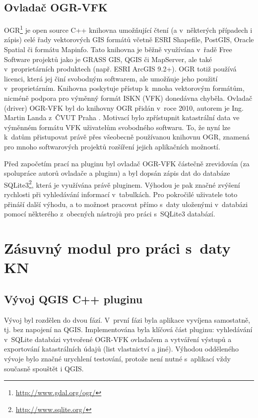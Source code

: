 \documentclass[a4paper,12pt]{article}
\begin{document}
\subsection{Ovladač OGR-VFK}
OGR\footnote{\url{http://www.gdal.org/ogr/}} je open source C++ knihovna umožňující čtení (a v~některých případech i zápis)
celé řady vektorových GIS formátů včetně ESRI Shapefile, PostGIS, Oracle Spatial či formátu \mbox{Mapinfo}.
Tato knihovna je běžně využívána v~řadě Free Software projektů jako je GRASS GIS, QGIS či \mbox{MapServer}, ale také v~proprietárních produktech (např. ESRI ArcGIS 9.2+).
OGR totiž používá licenci, která jej činí svobodným softwarem, ale umožňuje jeho použití v~proprietárním.
Knihovna poskytuje přístup k~mnoha vektorovým formátům, nicméně podpora pro výměnný formát ISKN (VFK) donedávna chyběla.
Ovladač (driver) OGR-VFK byl do knihovny OGR přidán v~roce 2010, autorem je Ing. Martin Landa z~ČVUT Praha \cite{vfkDriver}.
Motivací bylo zpřístupnit katastrální data ve výměnném formátu VFK uživatelům svobodného softwaru.
To, že nyní lze k~datům přistupovat právě přes všeobecně používanou knihovnu OGR, znamená pro mnoho softwarových projektů rozšíření jejich aplikačních možností.

Před započetím prací na pluginu byl ovladač OGR-VFK částečně zrevidován (za spolupráce autorů ovladače a pluginu)
a byl dopsán zápis dat do databáze SQLite3\footnote{\url{http://www.sqlite.org/}}, která je využívána právě pluginem.
Výhodou je pak značné zvýšení rychlosti při vyhledávání informací v~tabulkách.
Pro pokročilé uživatele toto přináší další výhodu, a to možnost pracovat přímo s~daty uloženými v~databázi pomocí některého z~obecných nástrojů pro práci s~SQLite3 databází.


\section{Zásuvný modul pro práci s~daty KN}

\subsection{Vývoj QGIS C++ pluginu}
Vývoj byl rozdělen do dvou fází.
V~první fázi byla aplikace vyvíjena samostatně, tj. bez napojení na QGIS.
Implementována byla klíčová část pluginu: vyhledávání v~SQLite databázi vytvořené OGR-VFK ovladačem a vytváření výstupů a exportování katastrálních údajů (list vlastnictví a jiné).
Výhodou odděleného vývoje bylo značné urychlení testování, protože není nutné s~aplikací vždy současně spouštět i QGIS.
\end{document}
